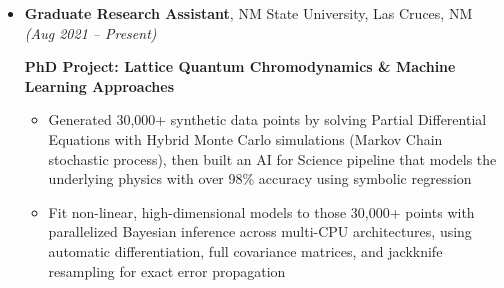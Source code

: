 \documentclass[11pt]{article}
\begin{document}
\begin{itemize}[label={}, leftmargin=0pt]
    \item \textbf{Graduate Research Assistant}, NM State University, Las Cruces, NM \hfill \textit{(Aug 2021 -- Present)}
    \vspace{-0.2em}

    \textbf{PhD Project: Lattice Quantum Chromodynamics \& Machine Learning Approaches}
    \vspace{-0.5em}
    \begin{itemize}
        \item Generated 30,000+ synthetic data points by solving Partial Differential Equations with Hybrid Monte Carlo simulations (Markov Chain stochastic process), then built an AI for Science pipeline that models the underlying physics with over 98\% accuracy using symbolic regression
        \vspace{-0.5em}
        \item Fit non-linear, high-dimensional models to those 30,000+ points with parallelized Bayesian inference across multi-CPU architectures, using automatic differentiation, full covariance matrices, and jackknife resampling for exact error propagation
    \end{itemize}
\end{itemize}

\vspace{0.3em}
\end{document}
